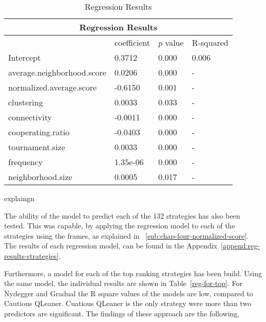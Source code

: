 \begin{table}[!hbtp]
	\centering
	\begin{adjustbox}{width=0.5\textwidth}
		\small
		\begin{tabular}{|l|l|l|l|}
			\hline
			\multicolumn{4}{|c|}{Regression Results}         \\ \hline
			                           & coefficient & \(p\) value & R-squared \\ \hline
			Intercept                  & 0.3712      & 0.000       & 0.006     \\ \hline
			average.neighborhood.score & 0.0206      & 0.000       & -         \\ \hline
			normalized.average.score   & -0.6150     & 0.001       & -         \\ \hline
			clustering                 & 0.0033      & 0.033       & -         \\ \hline
			connectivity               & -0.0011     & 0.000       & -         \\ \hline
			cooperating.ratio          & -0.0403     & 0.000       & -         \\ \hline
			tournament.size            & 0.0033      & 0.000       & -         \\ \hline
			frequency                  & 1.35e-06    & 0.000       & -         \\ \hline
			neighborhood.size          & 0.0005      & 0.017       & -         \\ \hline

		\end{tabular}
	\end{adjustbox}
	\caption{Regression Results}
	\label{regression-complex-networks}
	explaingn
\end{table}

The ability of the model to predict each of the 132 strategies has also been
tested. This was capable, by applying the regression model to each of the strategies
using the frames, as explained in ~\ref{sub:chap-four-normalized-score}.
The results of each regression model, can be found in the Appendix~\ref{append:reg-results-strategies}.

Furthermore, a model for each of the top ranking strategies has been build.
Using the same model, the individual results are shown in Table~\ref{reg-for-top}.
For Nydegger and Gradual the R square values of the models are low, compared
to Cautious QLeaner. Cuatious QLeaner is the only strategy were more than two
predictors are significant. The findings of these approach are the following,

